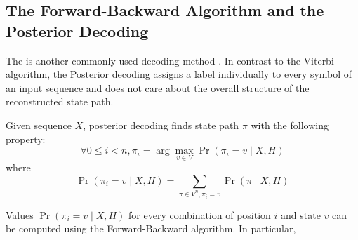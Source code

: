 \subsection{The Forward-Backward Algorithm and  the Posterior Decoding}

The  is another commonly used decoding method
\cite{Kall2005, Durbin1998}. In contrast to the Viterbi algorithm, the
Posterior decoding assigns a label individually to every symbol of an input
sequence and does not care about the overall structure of the reconstructed
state path. 

Given sequence $X$, posterior decoding finds state path $\pi$ with the following
property:
\[\forall 0\leq i< n, \pi_i=\arg\max_{v\in V}\Pr\left(\pi_i=v\mid X,H\right) \]
where \[\Pr\left(\pi_i=v\mid X,H\right) = \sum_{\pi\in V^n,\pi_i=v}\Pr\left(\pi\mid X,H\right)\]

Values $\Pr\left(\pi_i=v\mid X,H\right)$ for every
combination of position $i$ and state $v$ can be computed using the Forward-Backward
algorithm. In particular,

